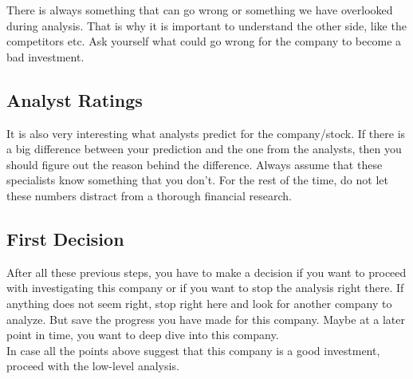 There is always something that can go wrong or something we have overlooked during
analysis. That is why it is important to understand the other side, like the competitors
etc. Ask yourself what could go wrong for the company to become a bad investment.

\subsection{Analyst Ratings}

It is also very interesting what analysts predict for the company/stock. If there
is a big difference between your prediction and the one from the analysts, then
you should figure out the reason behind the difference. Always assume that these 
specialists know something that you don't. For the rest of the time, do not let
these numbers distract from a thorough financial research.

\subsection{First Decision}

After all these previous steps, you have to make a decision if you want to proceed with
investigating this company or if you want to stop the analysis right there. If anything
does not seem right, stop right here and look for another company to analyze. But save
the progress you have made for this company. Maybe at a later point in time, you want
to deep dive into this company.\\

In case all the points above suggest that this company is a good investment, proceed
with the low-level analysis.
